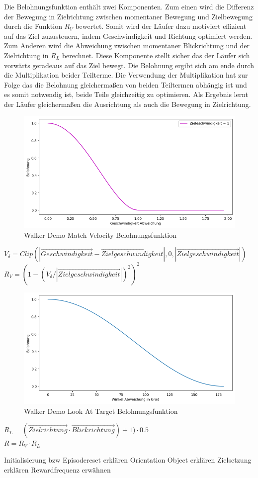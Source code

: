 Die Belohnungsfunktion enthält zwei Komponenten. Zum einen wird die Differenz der Bewegung in Zielrichtung zwischen momentaner Bewegung und Zielbewegung durch die Funktion $R_V$ bewertet. Somit wird der Läufer dazu motiviert effizient auf das Ziel zuzusteuern, indem Geschwindigkeit und Richtung optimiert werden. Zum Anderen wird die Abweichung zwischen momentaner Blickrichtung und der Zielrichtung in $R_L$ berechnet. Diese Komponente stellt sicher das der Läufer sich vorwärts geradeaus auf das Ziel bewegt. Die Belohnung ergibt sich am ende durch die Multiplikation beider Teilterme. Die Verwendung der Multiplikation hat zur Folge das die Belohnung gleichermaßen von beiden Teiltermen abhängig ist und es somit notwendig ist, beide Teile gleichzeitig zu optimieren. Als Ergebnis lernt der Läufer gleichermaßen die Ausrichtung als auch die Bewegung in Zielrichtung.

\begin{figure}[H]
  \centering  
  \includegraphics[scale=0.5]{img/match_velocity_demo_vel1.png}
  \caption{Walker Demo Match Velocity Belohnungsfunktion}
  \label{fig:match_velocity_demo_vel1}
\end{figure}

$V_\delta=Clip(|\vec{Geschwindigkeit} - \vec{Zielgeschwindigkeit}|, 0, |\vec{Zielgeschwindigkeit}|)$ \\
$R_V=(1 - (V_\delta / |\vec{Zielgeschwindigkeit}|)^2)^2$ \\

\begin{figure}[H]
  \centering  
  \includegraphics[scale=0.5]{img/look_at_target_demo.png}
  \caption{Walker Demo Look At Target Belohnungsfunktion}
  \label{fig:look_at_target_demo}
\end{figure}

$R_L=(\vec{Zielrichtung} \cdot \vec{Blickrichtung})+ 1) \cdot 0.5$ \\
$R=R_V \cdot R_L$

Initialisierung bzw Episodereset erklären
Orientation Object erklären
Zielsetzung erklären
Rewardfrequenz erwähnen